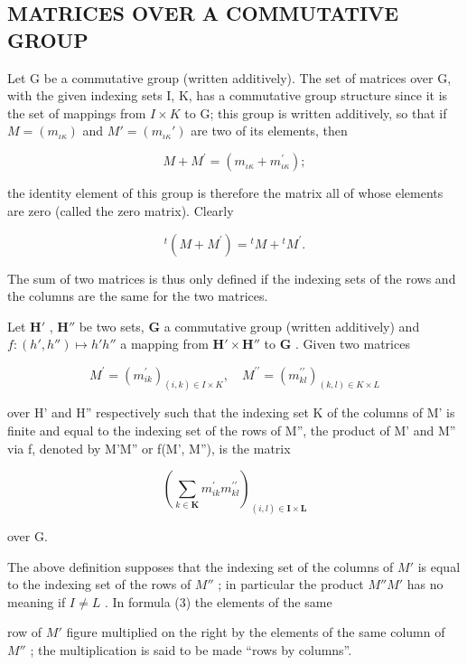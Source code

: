 \subsection{MATRICES OVER A COMMUTATIVE GROUP}

Let G be a commutative group (written additively). The set of matrices over G, with the given indexing sets I, K, has a commutative group structure since it is the set of mappings from \(I \times K\) to G; this group is written additively, so that if \(M = (m_{\iota\kappa})\) and \(M' = (m_{\iota\kappa}')\) are two of its elements, then

\[
M + M ^ {\prime} = (m _ {\iota \kappa} + m _ {\iota \kappa} ^ {\prime});
\]

the identity element of this group is therefore the matrix all of whose elements are zero (called the zero matrix). Clearly

\[
{ } ^ { t } ( M + M ^ { \prime } ) = { } ^ { t } M + { } ^ { t } M ^ { \prime } .\tag{2}
\]

The sum of two matrices is thus only defined if the indexing sets of the rows and the columns are the same for the two matrices.

Let \(\mathbf{H}'\) , \(\mathbf{H}''\) be two sets, \(\mathbf{G}\) a commutative group (written additively) and \(f: (h', h'') \mapsto h'h''\) a mapping from \(\mathbf{H}' \times \mathbf{H}''\) to \(\mathbf{G}\) . Given two matrices

\[
M ^ {\prime} = \left(m _ {i k} ^ {\prime}\right) _ {(i, k) \in I \times K}, \quad M ^ {\prime \prime} = \left(m _ {k l} ^ {\prime \prime}\right) _ {(k, l) \in K \times L}
\]

over H' and H'' respectively such that the indexing set K of the columns of M' is finite and equal to the indexing set of the rows of M'', the product of M' and M'' via f, denoted by M'M'' or f(M', M''), is the matrix

\[
\left(\sum_ {k \in \mathbf {K}} m _ {i k} ^ {\prime} m _ {k l} ^ {\prime \prime}\right) _ {(i, l) \in \mathbf {I} \times \mathbf {L}}\tag{3}
\]

over G.

The above definition supposes that the indexing set of the columns of \(M'\) is equal to the indexing set of the rows of \(M''\) ; in particular the product \(M''M'\) has no meaning if \(I \neq L\) . In formula (3) the elements of the same

row of \(M'\) figure multiplied on the right by the elements of the same column of \(M''\) ; the multiplication is said to be made ``rows by columns''.

